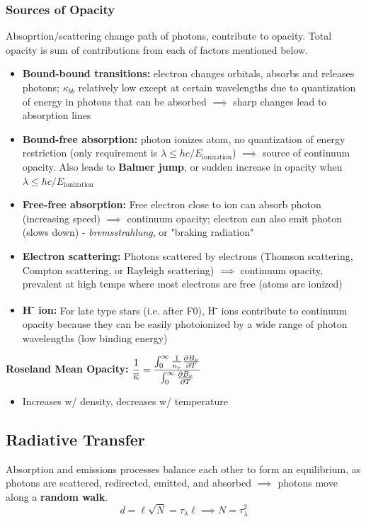 \documentclass[12pt]{article}
\begin{document}
\subsubsection{Sources of Opacity}
Absoprtion/scattering change path of photons, contribute to opacity. Total opacity is sum of contributions from each of factors mentioned below.
\begin{itemize}
    \item \textbf{Bound-bound transitions:} electron changes orbitals, absorbs and releases photons; $\kappa_{bb}$ relatively low except at certain wavelengths due to quantization of energy in photons that can be absorbed $\implies$ sharp changes lead to absorption lines
    \item \textbf{Bound-free absorption:} photon ionizes atom, no quantization of energy restriction (only requirement is $\lambda \leq hc/E_\text{ionization}$) $\implies$ source of continuum opacity. Also leads to \textbf{Balmer jump}, or sudden increase in opacity when $\lambda \leq hc/E_\text{ionization}$
    \item \textbf{Free-free absorption:} Free electron close to ion can absorb photon (increasing speed) $\implies$ continuum opacity; electron can also emit photon (slows down) - \textit{bremsstrahlung}, or "braking radiation"
    \item \textbf{Electron scattering:} Photons scattered by electrons (Thomson scattering, Compton scattering, or Rayleigh scattering) $\implies$ continuum opacity, prevalent at high temps where most electrons are free (atoms are ionized)
    \item \textbf{H\textsuperscript{-} ion:} For late type stars (i.e. after F0), H\textsuperscript{-} ions contribute to continuum opacity because they can be easily photoionized by a wide range of photon wavelengths (low binding energy)
\end{itemize}

\textbf{Roseland Mean Opacity:} $\dfrac{1}{\overline{\kappa}} = \dfrac{\int_{0}^{\infty}\frac{1}{\kappa_\nu}\pdv{B_\nu}{T}}{\int_{0}^{\infty}\pdv{B_\nu}{T}}$
\begin{itemize}
    \item Increases w/ density, decreases w/ temperature
\end{itemize}

\subsection{Radiative Transfer}
Absorption and emissions processes balance each other to form an equilibrium, as photons are scattered, redirected, emitted, and absorbed $\implies$ photons move along a \textbf{random walk}. $$d = \ell\sqrt{N} = \tau_\lambda\ell \implies N = \tau_\lambda^2$$
\end{document}
